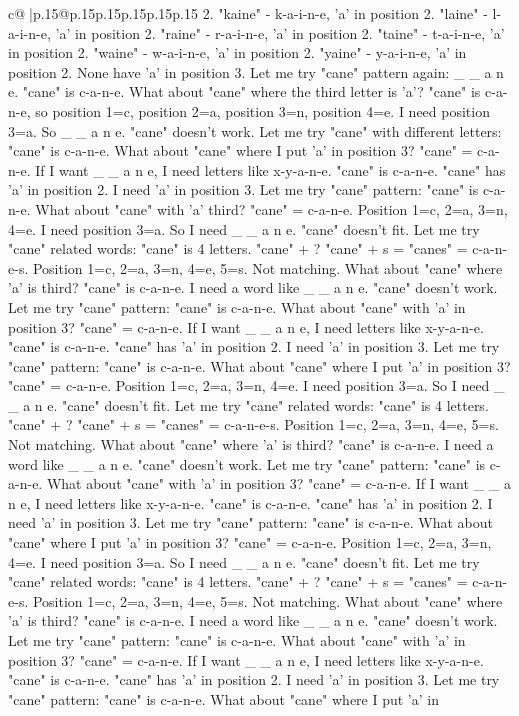 \documentclass{article}
\begin{document}
{\begin{supertabular}{c@{$\;$}|p{.15\linewidth}@{}p{.15\linewidth}p{.15\linewidth}p{.15\linewidth}p{.15\linewidth}p{.15\linewidth}}
{{{2. "kaine" {-} k{-}a{-}i{-}n{-}e, 'a' in position 2. "laine" {-} l{-}a{-}i{-}n{-}e, 'a' in position 2. "raine" {-} r{-}a{-}i{-}n{-}e, 'a' in position 2. "taine" {-} t{-}a{-}i{-}n{-}e, 'a' in position 2. "waine" {-} w{-}a{-}i{-}n{-}e, 'a' in position 2. "yaine" {-} y{-}a{-}i{-}n{-}e, 'a' in position 2. None have 'a' in position 3. Let me try "cane" pattern again: \_ \_ a n e. "cane" is c{-}a{-}n{-}e. What about "cane" where the third letter is 'a'? "cane" is c{-}a{-}n{-}e, so position 1=c, position 2=a, position 3=n, position 4=e. I need position 3=a. So \_ \_ a n e. "cane" doesn't work. Let me try "cane" with different letters: "cane" is c{-}a{-}n{-}e. What about "cane" where I put 'a' in position 3? "cane" = c{-}a{-}n{-}e. If I want \_ \_ a n e, I need letters like x{-}y{-}a{-}n{-}e. "cane" is c{-}a{-}n{-}e. "cane" has 'a' in position 2. I need 'a' in position 3. Let me try "cane" pattern: "cane" is c{-}a{-}n{-}e. What about "cane" with 'a' third? "cane" = c{-}a{-}n{-}e. Position 1=c, 2=a, 3=n, 4=e. I need position 3=a. So I need \_ \_ a n e. "cane" doesn't fit. Let me try "cane" related words: "cane" is 4 letters. "cane" + ? "cane" + s = "canes" = c{-}a{-}n{-}e{-}s. Position 1=c, 2=a, 3=n, 4=e, 5=s. Not matching. What about "cane" where 'a' is third? "cane" is c{-}a{-}n{-}e. I need a word like \_ \_ a n e. "cane" doesn't work. Let me try "cane" pattern: "cane" is c{-}a{-}n{-}e. What about "cane" with 'a' in position 3? "cane" = c{-}a{-}n{-}e. If I want \_ \_ a n e, I need letters like x{-}y{-}a{-}n{-}e. "cane" is c{-}a{-}n{-}e. "cane" has 'a' in position 2. I need 'a' in position 3. Let me try "cane" pattern: "cane" is c{-}a{-}n{-}e. What about "cane" where I put 'a' in position 3? "cane" = c{-}a{-}n{-}e. Position 1=c, 2=a, 3=n, 4=e. I need position 3=a. So I need \_ \_ a n e. "cane" doesn't fit. Let me try "cane" related words: "cane" is 4 letters. "cane" + ? "cane" + s = "canes" = c{-}a{-}n{-}e{-}s. Position 1=c, 2=a, 3=n, 4=e, 5=s. Not matching. What about "cane" where 'a' is third? "cane" is c{-}a{-}n{-}e. I need a word like \_ \_ a n e. "cane" doesn't work. Let me try "cane" pattern: "cane" is c{-}a{-}n{-}e. What about "cane" with 'a' in position 3? "cane" = c{-}a{-}n{-}e. If I want \_ \_ a n e, I need letters like x{-}y{-}a{-}n{-}e. "cane" is c{-}a{-}n{-}e. "cane" has 'a' in position 2. I need 'a' in position 3. Let me try "cane" pattern: "cane" is c{-}a{-}n{-}e. What about "cane" where I put 'a' in position 3? "cane" = c{-}a{-}n{-}e. Position 1=c, 2=a, 3=n, 4=e. I need position 3=a. So I need \_ \_ a n e. "cane" doesn't fit. Let me try "cane" related words: "cane" is 4 letters. "cane" + ? "cane" + s = "canes" = c{-}a{-}n{-}e{-}s. Position 1=c, 2=a, 3=n, 4=e, 5=s. Not matching. What about "cane" where 'a' is third? "cane" is c{-}a{-}n{-}e. I need a word like \_ \_ a n e. "cane" doesn't work. Let me try "cane" pattern: "cane" is c{-}a{-}n{-}e. What about "cane" with 'a' in position 3? "cane" = c{-}a{-}n{-}e. If I want \_ \_ a n e, I need letters like x{-}y{-}a{-}n{-}e. "cane" is c{-}a{-}n{-}e. "cane" has 'a' in position 2. I need 'a' in position 3. Let me try "cane" pattern: "cane" is c{-}a{-}n{-}e. What about "cane" where I put 'a' in }}}
\end{supertabular}}
\end{document}
